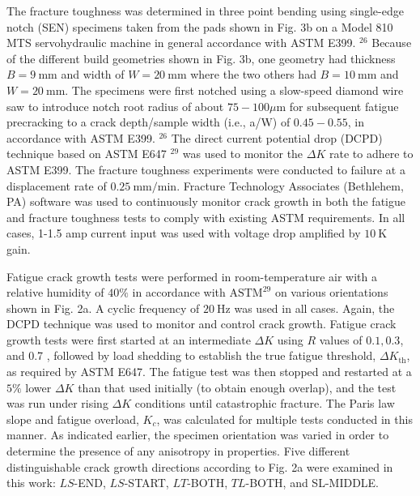 \documentclass[10pt]{article}
\begin{document}
The fracture toughness was determined in three point bending using single-edge notch (SEN) specimens taken from the pads shown in Fig. 3b on a Model 810 MTS servohydraulic machine in general accordance with ASTM E399. ${ }^{26}$ Because of the different build geometries shown in Fig. 3b, one geometry had thickness $B=9 \mathrm{~mm}$ and width of $W=20 \mathrm{~mm}$ where the two others had $B=10 \mathrm{~mm}$ and $W=20 \mathrm{~mm}$. The specimens were first notched using a slow-speed diamond wire saw to introduce notch root radius of about $75-100 \mu \mathrm{m}$ for subsequent fatigue precracking to a crack depth/sample width (i.e., a/W) of $0.45-0.55$, in accordance with ASTM E399. ${ }^{26}$ The direct current potential drop (DCPD) technique based on ASTM E647 ${ }^{29}$ was used to monitor the $\Delta K$ rate to adhere to ASTM E399. The fracture toughness experiments were conducted to failure at a displacement rate of $0.25 \mathrm{~mm} / \mathrm{min}$. Fracture Technology Associates (Bethlehem, PA) software was used to continuously monitor crack growth in both the fatigue and fracture toughness tests to comply with existing ASTM requirements. In all cases, 1-1.5 amp current input was used with voltage drop amplified by $10 \mathrm{~K}$ gain.

Fatigue crack growth tests were performed in room-temperature air with a relative humidity of $40 \%$ in accordance with $\mathrm{ASTM}^{29}$ on various orientations shown in Fig. 2a. A cyclic frequency of $20 \mathrm{~Hz}$ was used in all cases. Again, the DCPD technique was used to monitor and control crack growth. Fatigue crack growth tests were first started at an intermediate $\Delta K$ using $R$ values of $0.1,0.3$, and 0.7 , followed by load shedding to establish the true fatigue threshold, $\Delta K_{\mathrm{th}}$, as required by ASTM E647. The fatigue test was then stopped and restarted at a $5 \%$ lower $\Delta K$ than that used initially (to obtain enough overlap), and the test was run under rising $\Delta K$ conditions until catastrophic fracture. The Paris law slope and fatigue overload, $K_{c}$, was calculated for multiple tests conducted in this manner. As indicated earlier, the specimen orientation was varied in order to determine the presence of any anisotropy in properties. Five different distinguishable crack growth directions according to Fig. 2a were examined in this work: $L S$-END, $L S$-START, $L T$-BOTH, $T L$-BOTH, and SL-MIDDLE.
\end{document}
